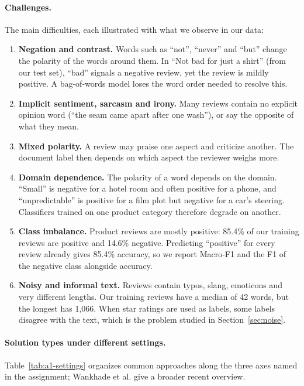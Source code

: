 \paragraph{Challenges.}
The main difficulties, each illustrated with what we observe in our data:
\begin{enumerate}
  \item \textbf{Negation and contrast.} Words such as ``not'', ``never'' and ``but'' change the polarity of the words around them. In ``Not bad for just a shirt'' (from our test set), ``bad'' signals a negative review, yet the review is mildly positive. A bag-of-words model loses the word order needed to resolve this.
  \item \textbf{Implicit sentiment, sarcasm and irony.} Many reviews contain no explicit opinion word (``the seam came apart after one wash''), or say the opposite of what they mean.
  \item \textbf{Mixed polarity.} A review may praise one aspect and criticize another. The document label then depends on which aspect the reviewer weighs more.
  \item \textbf{Domain dependence.} The polarity of a word depends on the domain. ``Small'' is negative for a hotel room and often positive for a phone, and ``unpredictable'' is positive for a film plot but negative for a car's steering. Classifiers trained on one product category therefore degrade on another\cite{blitzer2007biographies}.
  \item \textbf{Class imbalance.} Product reviews are mostly positive: 85.4\% of our training reviews are positive and 14.6\% negative. Predicting ``positive'' for every review already gives 85.4\% accuracy, so we report Macro-F1 and the F1 of the negative class alongside accuracy.
  \item \textbf{Noisy and informal text.} Reviews contain typos, slang, emoticons and very different lengths. Our training reviews have a median of 42 words, but the longest has 1{,}066. When star ratings are used as labels, some labels disagree with the text, which is the problem studied in Section~\ref{sec:noise}.
\end{enumerate}

\paragraph{Solution types under different settings.}
Table~\ref{tab:a1-settings} organizes common approaches along the three axes named in the assignment; Wankhade et al.\cite{wankhade2022survey} give a broader recent overview.

